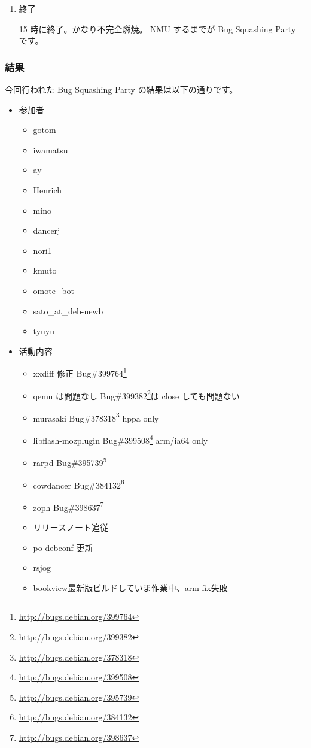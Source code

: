 \documentclass[mingoth,a4paper]{jsarticle}
\newcommand{\debianbug}[1]{Bug\##1\footnote{\url{http://bugs.debian.org/#1}}}
\begin{document}
\begin{enumerate}
\begin{itemize}
	\url{http://bugs.debian.org/release-critical/}
  \item 現在の RC バグ情報 
	
	\url{http://bugs.debian.org/release-critical/debian/all.html}
  \item リリースチームが使っている RC バグ管理サイト 
	
\url{http://bts.turmzimmer.net/details.php}
 \end{itemize}
\item 終了

 15 時に終了。かなり不完全燃焼。
 NMU するまでが Bug Squashing Party です。

\end{enumerate}

\subsubsection{結果}
 今回行われた Bug Squashing Party の結果は以下の通りです。

\begin{itemize}
 \item 参加者
   \begin{itemize}
   \item gotom
   \item iwamatsu
   \item ay\_
   \item Henrich
   \item mino
   \item dancerj
   \item nori1
   \item kmuto
   \item omote\_bot
   \item sato\_at\_deb-newb
   \item tyuyu
   \end{itemize}

 \item 活動内容
   \begin{itemize}
   \item xxdiff 修正 \debianbug{399764}
   \item qemu は問題なし \debianbug{399382}は close しても問題ない
   \item murasaki \debianbug{378318} hppa only
   \item libflash-mozplugin \debianbug{399508} arm/ia64 only
   \item rarpd \debianbug{395739}
   \item cowdancer \debianbug{384132}
   \item zoph \debianbug{398637}
   \item リリースノート追従
   \item po-debconf 更新
   \item rsjog
   \item bookview最新版ビルドしていま作業中、arm fix失敗
   \end{itemize}
\end{itemize}
\end{document}
